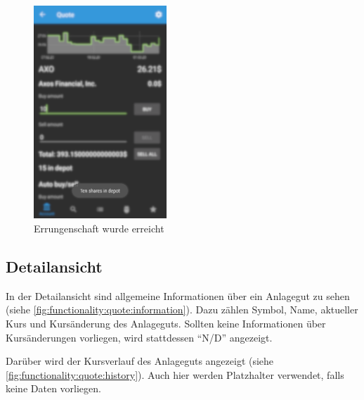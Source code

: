 \documentclass[a4paper]{article}
\begin{document}
\begin{figure}[H]
    \centering
    \includegraphics[height=8cm,keepaspectratio]{./images/achievement_reached.png}
    \caption{Errungenschaft wurde erreicht}
    \label{fig:functionality:achievements:reached}
\end{figure}


\subsection{Detailansicht}
\label{subsec:functionality:quote}
In der Detailansicht sind allgemeine Informationen über ein Anlagegut zu sehen (siehe \autoref{fig:functionality:quote:information}).
Dazu zählen Symbol, Name, aktueller Kurs und Kursänderung des Anlageguts.
Sollten keine Informationen über Kursänderungen vorliegen, wird stattdessen "`N/D"' angezeigt.

Darüber wird der Kursverlauf des Anlageguts angezeigt (siehe \autoref{fig:functionality:quote:history}).
Auch hier werden Platzhalter verwendet, falls keine Daten vorliegen.
\end{document}
